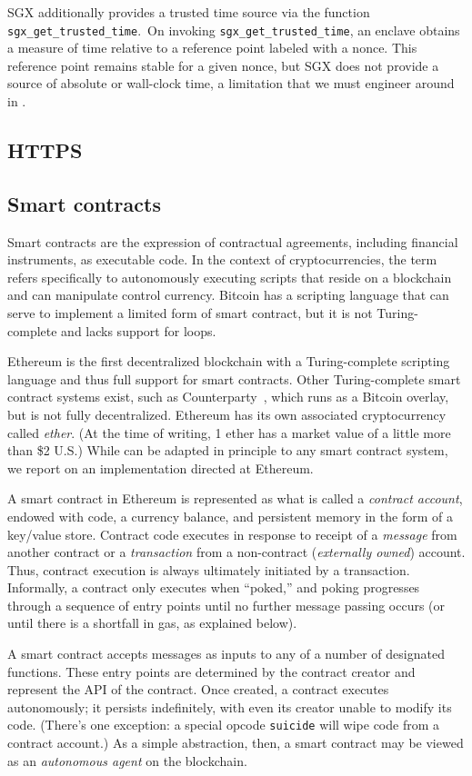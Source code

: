 SGX additionally provides a trusted time source via the function \texttt{sgx\_get\_trusted\_time}.~On invoking \texttt{sgx\_get\_trusted\_time}, an enclave obtains a measure of time relative to a reference point labeled with a nonce. This reference point remains stable for a given nonce, but SGX does not provide a source of absolute or wall-clock time, a limitation that we must engineer around in \tc.

\subsection{HTTPS}
\subsection{Smart contracts}

Smart contracts are the expression of contractual agreements, including financial instruments, as executable code. In the context of cryptocurrencies, the term refers specifically to autonomously executing scripts that reside on a blockchain and can manipulate control currency. Bitcoin has a scripting language that can serve to implement a limited form of smart contract, but it is not Turing-complete and lacks support for loops. 

Ethereum is the first decentralized blockchain with a Turing-complete scripting language and thus full support for smart contracts. Other Turing-complete smart contract systems exist, such as Counterparty~\cite{}, which runs as a Bitcoin overlay, but is not fully decentralized. Ethereum has its own associated cryptocurrency called \emph{ether}. (At the time of writing, 1 ether has a market value of a little more than \$2 U.S.) While \tc can be adapted in principle to any smart contract system, we report on an implementation directed at Ethereum.

A smart contract in Ethereum is represented as what is called a \emph{contract account}, endowed with code, a currency balance, and persistent memory in the form of a key/value store. Contract code executes in response to receipt of a \emph{message} from another contract or a \emph{transaction} from a non-contract (\emph{externally owned}) account. Thus, contract execution is always ultimately initiated by a transaction. Informally, a contract only executes when ``poked,'' and poking progresses through a sequence of entry points until no further message passing occurs (or until there is a shortfall in gas, as explained below).

A smart contract accepts messages as inputs to any of a number of designated functions. These entry points are determined by the contract creator and represent the API of the contract. Once created, a contract executes autonomously; it persists indefinitely, with even its creator unable to modify its code. (There's one exception: a special opcode \texttt{suicide} will wipe code from a contract account.) As a simple abstraction, then, a smart contract may be viewed as an {\em autonomous agent} on the blockchain. 

